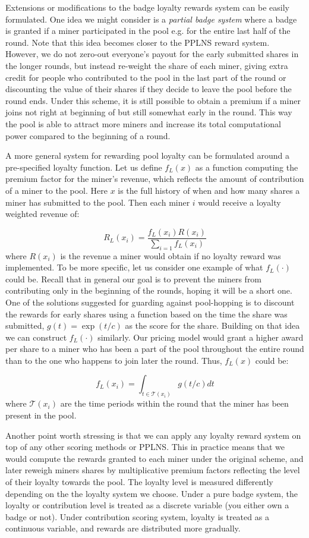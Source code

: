 \documentclass{article}
\theoremstyle{plain}
\theoremstyle{definition}
\begin{document}
Extensions or modifications to the badge loyalty rewards system can be easily 
formulated. One idea we might consider is a \emph{partial badge system} where
a badge is granted if a miner participated in the pool e.g. for the entire
last half of the round. Note that this idea becomes closer to the PPLNS
reward system. However, we do not zero-out everyone's payout for the early 
submitted shares in the longer rounds, but instead re-weight the share of
each miner, giving extra credit for people who contributed to the pool
in the last part of the round or discounting the value of their shares if
they decide to leave the pool before the round ends.
Under this scheme, it is still possible to obtain a premium if a miner
joins not right at beginning of but still somewhat early in the round.
This way the pool is able to attract more miners and increase its
total computational power compared to the beginning of a round.

A more general system for rewarding pool loyalty can be formulated 
around a pre-specified loyalty function. Let us define $f_L(x)$
as a function computing the premium factor for the miner's revenue,
which reflects the amount of contribution of a miner to the pool.
Here $x$ is the full history of when and how many shares a
miner has submitted to the pool. Then each miner $i$ would receive 
a loyalty weighted revenue of:

$$
R_L(x_i) = \frac{f_L(x_i)R(x_i)}{\sum_{i = 1}f_L(x_i)} 
$$
where $R(x_i)$ is the revenue a miner would obtain if no loyalty
reward was implemented. To be more specific, let us consider one example
of what $f_L(\cdot)$ could be. Recall that in general our goal
is to prevent the miners from contributing only in the beginning
of the rounds, hoping it will be a short one. One of the solutions
suggested for guarding against pool-hopping is to discount the 
rewards for early shares using a function based on the time the share 
was submitted, $g(t) = \exp(t/c)$ as the score for the share.
Building on that idea we can construct $f_L(\cdot)$ similarly.
Our pricing model would grant a higher award 
per share to a miner who has been a part of the pool throughout 
the entire round than to the one who happens to join later
the round. Thus, $f_L(x)$ could be:

\[
f_L(x_i) = \int_{t \in \mathcal{T}(x_i)} g(t/c) dt
\]
where $\mathcal{T}(x_i)$ are the time periods within the round
that the miner has been present in the pool.

Another point worth stressing is that we can apply any loyalty reward system 
on top of any other scoring methods or PPLNS. This in practice means that 
we would compute the rewards granted to each miner under the original
scheme, and later reweigh miners shares by multiplicative premium 
factors reflecting the level of their loyalty towards the pool. 
The loyalty level is measured differently depending on the the loyalty 
system we choose. Under a pure badge system, the loyalty or contribution
level is treated as a discrete variable (you either own a badge or not).
Under contribution scoring system, loyalty is treated as a continuous 
variable, and rewards are distributed more gradually.
\end{document}
